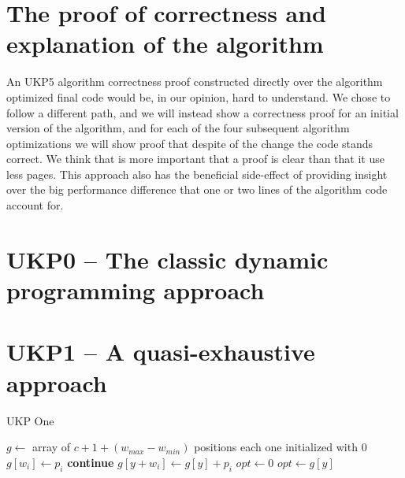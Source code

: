 \documentclass[12pt]{article}
\begin{document}
\section{The proof of correctness and explanation of the algorithm}

An UKP5 algorithm correctness proof constructed directly over the algorithm optimized final code would be, in our opinion, hard to understand. We chose to follow a different path, and we will instead show a correctness proof for an initial version of the algorithm, and for each of the four subsequent algorithm optimizations we will show proof that despite of the change the code stands correct. We think that is more important that a proof is clear than that it use less pages. This approach also has the beneficial side-effect of providing insight over the big performance difference that one or two lines of the algorithm code account for.

\section{UKP0 -- The classic dynamic programming approach}

\section{UKP1 -- A quasi-exhaustive approach}

\begin{algorithm}
\caption{UKP One}\label{alg:ukp1}
\begin{algorithmic}[1]
  \State \(g \gets\) array of \(c + 1 + (w_{max} - w_{min})\) positions each one initialized with \(0\)\label{ukp1:create_g}
  \State %
  \label{begin_trivial_bounds}
      \State \(g[w_i] \gets p_i\)
    \EndIf
  \EndFor\label{end_trivial_bounds}
  \State %
  \label{ukp1:main_ext_loop_begin}
    \label{ukp1:if_equal_to_zero}
    	\State \textbf{continue}
    \EndIf\label{ukp1:if_equal_to_zero}
    \State %
    \label{ukp1:main_inner_loop_begin}
      \label{ukp1:if_better_solution_begin}
        \State \(g[y + w_i] \gets g[y] + p_i\)
      \EndIf\label{ukp1:if_better_solution_end}
    \EndFor\label{ukp1:main_inner_loop_end}
  \EndFor\label{ukp1:main_ext_loop_end}
  \State %
  \State \(opt \gets 0\)
  \label{ukp1:get_opt_loop_begin}
    \label{ukp1:opt_loop_if}
      \State \(opt \gets g[y]\)
    \EndIf
  \EndFor\label{ukp1:get_opt_loop_end}
\EndProcedure
\end{algorithmic}
\end{algorithm}
\end{document}
